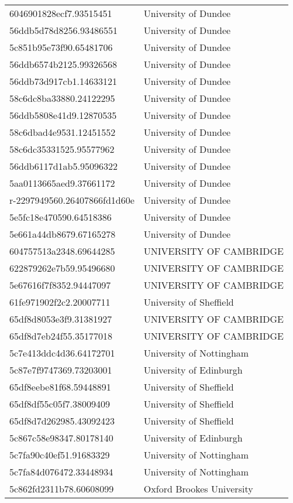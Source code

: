\begin{tabular}{ll}
6046901828ecf7.93515451 & University of Dundee \\
56ddb5d78d8256.93486551 & University of Dundee \\
5c851b95e73f90.65481706 & University of Dundee \\
56ddb6574b2125.99326568 & University of Dundee \\
56ddb73d917cb1.14633121 & University of Dundee \\
58c6dc8ba33880.24122295 & University of Dundee \\
56ddb5808e41d9.12870535 & University of Dundee \\
58c6dbad4e9531.12451552 & University of Dundee \\
58c6dc35331525.95577962 & University of Dundee \\
56ddb6117d1ab5.95096322 & University of Dundee \\
5aa0113665aed9.37661172 & University of Dundee \\
r-2297949560.26407866fd1d60e & University of Dundee \\
5e5fc18e470590.64518386 & University of Dundee \\
5e661a44db8679.67165278 & University of Dundee \\
604757513a2348.69644285 & UNIVERSITY OF CAMBRIDGE \\
622879262e7b59.95496680 & UNIVERSITY OF CAMBRIDGE \\
5e67616f7f8352.94447097 & UNIVERSITY OF CAMBRIDGE \\
61fe971902f2c2.20007711 & University of Sheffield \\
65df8d8053e3f9.31381927 & UNIVERSITY OF CAMBRIDGE \\
65df8d7eb24f55.35177018 & UNIVERSITY OF CAMBRIDGE \\
5c7e413ddc4d36.64172701 & University of Nottingham \\
5c87e7f9747369.73203001 & University of Edinburgh \\
65df8eebe81f68.59448891 & University of Sheffield \\
65df8df55c05f7.38009409 & University of Sheffield \\
65df8d7d262985.43092423 & University of Sheffield \\
5c867c58e98347.80178140 & University of Edinburgh \\
5c7fa90c40ef51.91683329 & University of Nottingham \\
5c7fa84d076472.33448934 & University of Nottingham \\
5c862fd2311b78.60608099 & Oxford Brookes University \\

\end{tabular}
